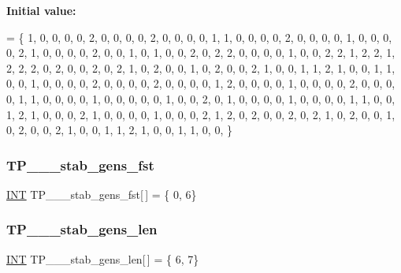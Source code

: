 {\bfseries Initial value\+:}
\begin{DoxyCode}
= \{
1, 0, 0, 0, 0, 2, 0, 0, 0, 0, 2, 0, 0, 0, 0, 1, 
1, 0, 0, 0, 0, 2, 0, 0, 0, 0, 1, 0, 0, 0, 0, 2, 
1, 0, 0, 0, 0, 2, 0, 0, 1, 0, 1, 0, 0, 2, 0, 2, 
2, 0, 0, 0, 0, 1, 0, 0, 2, 2, 1, 2, 2, 1, 2, 2, 
2, 0, 2, 0, 0, 2, 0, 2, 1, 0, 2, 0, 0, 1, 0, 2, 
0, 0, 2, 1, 0, 0, 1, 1, 2, 1, 0, 0, 1, 1, 0, 0, 
1, 0, 0, 0, 0, 2, 0, 0, 0, 0, 2, 0, 0, 0, 0, 1, 
2, 0, 0, 0, 0, 1, 0, 0, 0, 0, 2, 0, 0, 0, 0, 1, 
1, 0, 0, 0, 0, 1, 0, 0, 0, 0, 0, 1, 0, 0, 2, 0, 
1, 0, 0, 0, 0, 1, 0, 0, 0, 0, 1, 1, 0, 0, 1, 2, 
1, 0, 0, 0, 2, 1, 0, 0, 0, 0, 1, 0, 0, 0, 2, 1, 
2, 0, 2, 0, 0, 2, 0, 2, 1, 0, 2, 0, 0, 1, 0, 2, 
0, 0, 2, 1, 0, 0, 1, 1, 2, 1, 0, 0, 1, 1, 0, 0, 
\}
\end{DoxyCode}
\mbox{\label{data___t_p_8_c_a169fca260bd87f572eaf7bd0b5b77273}} 
\subsubsection{\texorpdfstring{T\+P\+\_\+\_\+\_\+stab\+\_\+gens\+\_\+fst}{TP\_3\_2\_stab\_gens\_fst}}
{\footnotesize\ttfamily \mbox{\hyperlink{galois_8h_a09fddde158a3a20bd2dcadb609de11dc}{I\+NT}} T\+P\+\_\+\_\+\_\+stab\+\_\+gens\+\_\+fst\mbox{[}$\,$\mbox{]} = \{ 0, 6\}}

\mbox{\label{data___t_p_8_c_a04b972b67b0b70b97f46505a50e1d7cb}} 
\subsubsection{\texorpdfstring{T\+P\+\_\+\_\+\_\+stab\+\_\+gens\+\_\+len}{TP\_3\_2\_stab\_gens\_len}}
{\footnotesize\ttfamily \mbox{\hyperlink{galois_8h_a09fddde158a3a20bd2dcadb609de11dc}{I\+NT}} T\+P\+\_\+\_\+\_\+stab\+\_\+gens\+\_\+len\mbox{[}$\,$\mbox{]} = \{ 6, 7\}}

